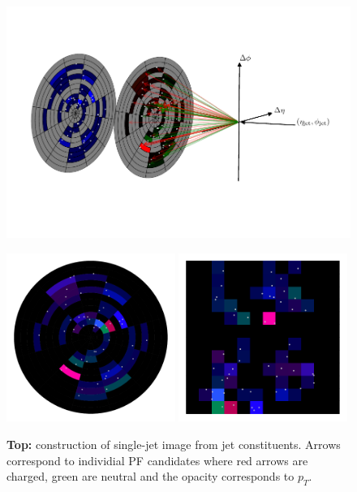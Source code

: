 \newpage
\begin{figure}[h!]
    \includegraphics[width=\textwidth]{figures/event_selection/jet_diagram_RGB.pdf}
    \begin{center}
        \includegraphics[width=0.49\textwidth]{figures/event_selection/full_image_polar.pdf}
        \includegraphics[width=0.49\textwidth]{figures/event_selection/full_image_rect.pdf}
    \end{center}
    \caption{\textbf{Top:} 
             construction of single-jet image from jet constituents. Arrows correspond to individial PF candidates where red arrows are charged, green are neutral and the opacity corresponds to $p_{T}$.
}
\end{figure}
